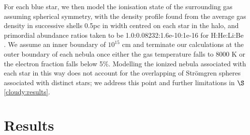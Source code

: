\documentclass[graphics, twocolumn, usenatbib]{mn2e}
\begin{document}
For each blue star, we then model the ionisation state of the surrounding gas assuming spherical symmetry, with the density profile found from the average gas density in successive shells 0.5pc in width centred on each star in the halo, and primordial abundance ratios taken to be 1.0:0.08232:1.6e-10:1e-16 for H:He:Li:Be \citep[consistent with the results of the][table 2, see {\sc cloudy} documentation for further discussion]{Planck_2014}. We assume an inner boundary of $10^{15}$ cm and terminate our calculations at the outer boundary of each nebula once either the gas temperature falls to 8000 K or the electron fraction falls below 5\%. Modelling the ionized nebula associated with each star in this way does not account for the overlapping of Str{\"o}mgren spheres associated with distinct stars; we address this point and further limitations in $\S$\ref{cloudy:results}.


\section{Results} \label{Sec:Results}
\end{document}
